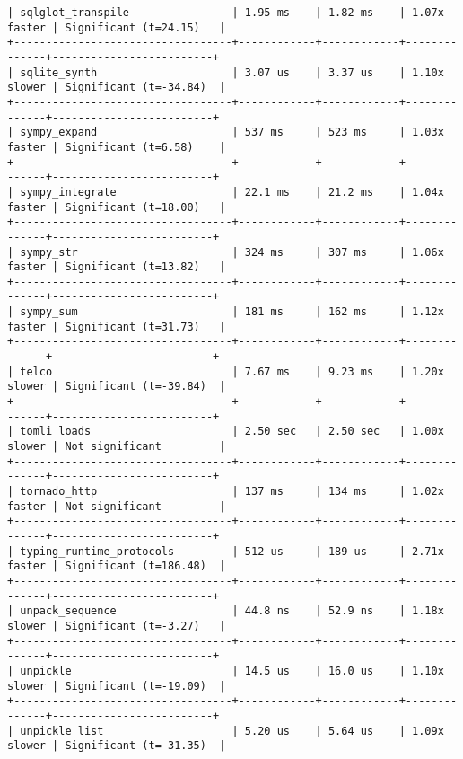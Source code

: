 \begin{code}
\begin{verbatim}
| sqlglot_transpile                | 1.95 ms    | 1.82 ms    | 1.07x faster | Significant (t=24.15)   |
+----------------------------------+------------+------------+--------------+-------------------------+
| sqlite_synth                     | 3.07 us    | 3.37 us    | 1.10x slower | Significant (t=-34.84)  |
+----------------------------------+------------+------------+--------------+-------------------------+
| sympy_expand                     | 537 ms     | 523 ms     | 1.03x faster | Significant (t=6.58)    |
+----------------------------------+------------+------------+--------------+-------------------------+
| sympy_integrate                  | 22.1 ms    | 21.2 ms    | 1.04x faster | Significant (t=18.00)   |
+----------------------------------+------------+------------+--------------+-------------------------+
| sympy_str                        | 324 ms     | 307 ms     | 1.06x faster | Significant (t=13.82)   |
+----------------------------------+------------+------------+--------------+-------------------------+
| sympy_sum                        | 181 ms     | 162 ms     | 1.12x faster | Significant (t=31.73)   |
+----------------------------------+------------+------------+--------------+-------------------------+
| telco                            | 7.67 ms    | 9.23 ms    | 1.20x slower | Significant (t=-39.84)  |
+----------------------------------+------------+------------+--------------+-------------------------+
| tomli_loads                      | 2.50 sec   | 2.50 sec   | 1.00x slower | Not significant         |
+----------------------------------+------------+------------+--------------+-------------------------+
| tornado_http                     | 137 ms     | 134 ms     | 1.02x faster | Not significant         |
+----------------------------------+------------+------------+--------------+-------------------------+
| typing_runtime_protocols         | 512 us     | 189 us     | 2.71x faster | Significant (t=186.48)  |
+----------------------------------+------------+------------+--------------+-------------------------+
| unpack_sequence                  | 44.8 ns    | 52.9 ns    | 1.18x slower | Significant (t=-3.27)   |
+----------------------------------+------------+------------+--------------+-------------------------+
| unpickle                         | 14.5 us    | 16.0 us    | 1.10x slower | Significant (t=-19.09)  |
+----------------------------------+------------+------------+--------------+-------------------------+
| unpickle_list                    | 5.20 us    | 5.64 us    | 1.09x slower | Significant (t=-31.35)  |

\end{verbatim}
\end{code}

